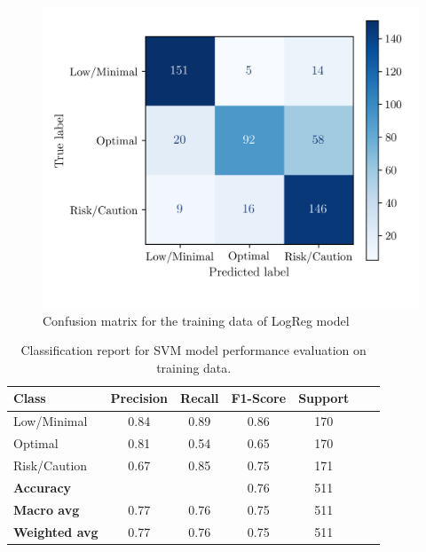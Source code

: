 \documentclass[conference]{IEEEtran}
\begin{document}
\begin{figure}[H]
    \centering
    \includegraphics[width=1\linewidth]{assets/SVM_ConfusionMatrixTrain.png}
    \caption{Confusion matrix for the training data of LogReg model}
    \label{svm_cm_train}
\end{figure}

\begin{table}[H]
\centering
\caption{Classification report for SVM model performance evaluation on training data.}
\label{crTrainSVM}
\begin{tabular}{lcccccc}
\toprule
\textbf{Class} & \textbf{Precision} & \textbf{Recall} & \textbf{F1-Score} & \textbf{Support} \\
\midrule
Low/Minimal & 0.84 & 0.89 & 0.86 & 170 \\
Optimal & 0.81 & 0.54 & 0.65 & 170 \\
Risk/Caution & 0.67 & 0.85 & 0.75 & 171 \\
\midrule
\textbf{Accuracy} &  &  & 0.76 & 511 \\
\textbf{Macro avg} & 0.77 & 0.76 & 0.75 & 511 \\
\textbf{Weighted avg} & 0.77 & 0.76 & 0.75 & 511 \\
\bottomrule
\end{tabular}
\end{table}
\end{document}
